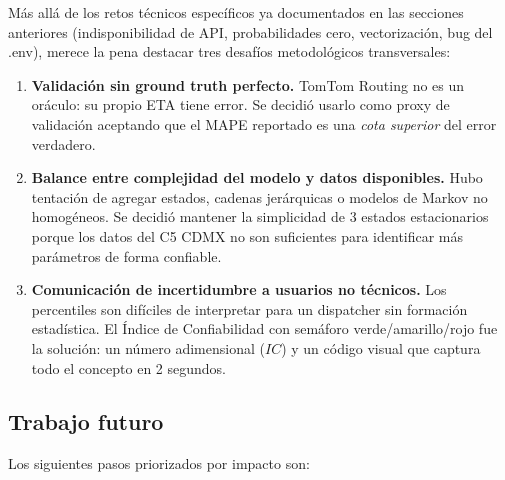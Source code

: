 \documentclass[11pt,a4paper]{article}
\begin{document}
Más allá de los retos técnicos específicos ya documentados en las secciones anteriores (indisponibilidad de API, probabilidades cero, vectorización, bug del .env), merece la pena destacar tres desafíos metodológicos transversales:

\begin{enumerate}[leftmargin=*]
\item \textbf{Validación sin ground truth perfecto.} TomTom Routing no es un oráculo: su propio ETA tiene error. Se decidió usarlo como proxy de validación aceptando que el MAPE reportado es una \textit{cota superior} del error verdadero.
\item \textbf{Balance entre complejidad del modelo y datos disponibles.} Hubo tentación de agregar estados, cadenas jerárquicas o modelos de Markov no homogéneos. Se decidió mantener la simplicidad de 3 estados estacionarios porque los datos del C5 CDMX no son suficientes para identificar más parámetros de forma confiable.
\item \textbf{Comunicación de incertidumbre a usuarios no técnicos.} Los percentiles son difíciles de interpretar para un dispatcher sin formación estadística. El Índice de Confiabilidad con semáforo verde/amarillo/rojo fue la solución: un número adimensional ($IC$) y un código visual que captura todo el concepto en 2 segundos.
\end{enumerate}

\subsection{Trabajo futuro}

Los siguientes pasos priorizados por impacto son:
\end{document}
